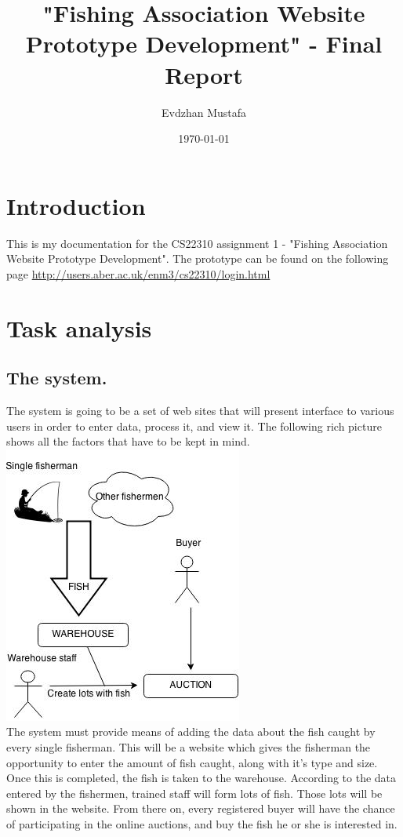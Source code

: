 \documentclass[a4paper]{article}
\title{"Fishing Association Website Prototype Development" - Final Report}
\author{Evdzhan Mustafa}
\date{\today}
\begin{document}
\maketitle

\section{Introduction}
This is my documentation for the CS22310 assignment 1 - "Fishing Association Website Prototype Development". The prototype can be found on the following page \url{http://users.aber.ac.uk/enm3/cs22310/login.html}
\section{Task analysis}
\subsection{The system.}
The system is going to be a set of web sites that will present interface to various users in order to enter data, process it, and view it. The following rich picture shows all the factors that have to be kept in mind. \\
\includegraphics[scale=0.8]{richpic.jpg}
\\
The system must provide means of adding the data about the fish caught by every single fisherman. This will be a website which gives the fisherman the opportunity to enter the amount of fish caught, along with it's type and size. Once this is completed, the fish is taken to the warehouse. According to the data entered by the fishermen, trained staff will  form lots of fish. Those lots will be shown in the website. From there on, every registered buyer will have the chance of participating in the online auctions, and buy the fish he or she is interested in. 
\end{document}
